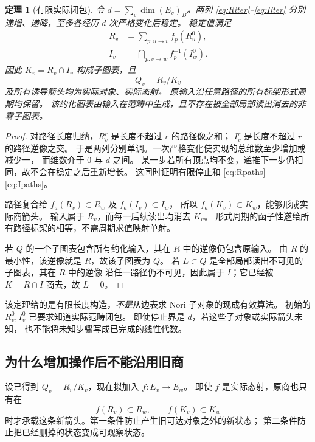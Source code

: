 \documentclass[11pt,a4paper]{ctexart}
\theoremstyle{cnplain}
\newtheorem{theorem}{定理}[section]
\theoremstyle{definition}
\theoremstyle{remark}
\begin{document}
\begin{theorem}[有限实际闭包]\label{thm:network}
令 $d=\sum_v\dim(E_v)_B$。两列 \eqref{eq:Riter}--\eqref{eq:Iiter}
分别递增、递降，至多各经历 $d$ 次严格变化后稳定。
稳定值满足
\begin{align}
 R_v&=\sum_{p:u\to v}f_p(R_u^0),\label{eq:Rpaths}\\
 I_v&=\bigcap_{p:v\to w}f_p^{-1}(I_w^0).\label{eq:Ipaths}
\end{align}
因此 $K_v=R_v\cap I_v$ 构成子图表，且
\begin{equation}\label{eq:networkQ}
 Q_v=R_v/K_v
\end{equation}
及所有诱导箭头均为实际对象、实际态射。
原输入沿任意路径的所有标架形式周期均保留。
该约化图表由输入在范畴中生成，且不存在被全部局部读出消去的非零子图表。
\end{theorem}
\begin{proof}
对路径长度归纳，$R_v^r$ 是长度不超过 $r$ 的路径像之和；
$I_v^r$ 是长度不超过 $r$ 的路径逆像之交。
于是两列分别单调。一次严格变化使实现的总维数至少增加或减少一，
而维数介于 $0$ 与 $d$ 之间。
某一步若所有顶点均不变，递推下一步仍相同，故不会在稳定之后重新增长。
这同时证明有限停止和 \eqref{eq:Rpaths}--\eqref{eq:Ipaths}。

路径复合给 $f_a(R_v)\subset R_w$ 及 $f_a(I_v)\subset I_w$，
所以 $f_a(K_v)\subset K_w$，能够形成实际商箭头。
输入属于 $R_v$，而每一后续读出均消去 $K_v$。
形式周期的函子性遂给所有路径标架的相等，不需周期求值映射单射。

若 $Q$ 的一个子图表包含所有约化输入，其在 $R$ 中的逆像仍包含原输入。
由 $R$ 的最小性，该逆像就是 $R$，故该子图表为 $Q$。
若 $L\subset Q$ 是全部局部读出不可见的子图表，其在 $R$ 中的逆像
沿任一路径仍不可见，因此属于 $I$；它已经被 $K=R\cap I$ 商去，故 $L=0$。
\end{proof}

该定理给的是有限长度构造，\emph{不是}从边表求 Nori 子对象的现成有效算法。
初始的 $R_v^0,I_v^0$ 已要求知道实际范畴闭包。
即使停止界是 $d$，若这些子对象或实际箭头未知，
也不能将未知步骤写成已完成的线性代数。

\subsection{为什么增加操作后不能沿用旧商}
设已得到 $Q_v=R_v/K_v$，现在拟加入 $f:E_v\to E_w$。
即使 $f$ 是实际态射，原商也只有在
\begin{equation}\label{eq:descent}
 f(R_v)\subset R_w,\qquad f(K_v)\subset K_w
\end{equation}
时才承载这条新箭头。第一条件防止产生旧可达对象之外的新状态；
第二条件防止把已经删掉的状态变成可观察状态。
\end{document}
